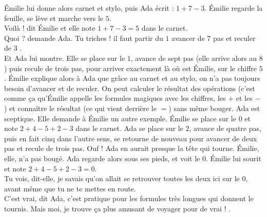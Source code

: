 Émilie lui donne alors carnet et stylo, puis Ada écrit : $1 + 7 - 3 $. Émilie regarde la feuille, se lève et marche vers le $5$.\\
\guillemotleft Voilà ! dit Émilie et elle note $1 + 7 - 3 = 5$ dans le carnet.\\
\mdash Quoi ? demande Ada. Tu triches ! il faut partir du $1$ avancer de $7$ pas et reculer de $3$ \guillemotright.\\
Et Ada lui montre. Elle se place sur le $1$, avance de sept pas (elle arrive alors au $8$) puis recule de trois pas, pour arriver exactement là où est Émilie, sur le chiffre $5$. Émilie explique alors à Ada que grâce au carnet et au stylo, on n’a pas toujours besoin d’avancer et de reculer. On peut calculer le résultat des opérations (c’est comme ça qu’Émilie appelle les formules magiques avec les chiffres, les $+$ et les $-$) et connaître le résultat (ce qui vient derrière le $=$) sans même bouger. Ada est sceptique. Elle demande à Émilie un autre exemple. Émilie se place sur le $0$ et note $2 + 4 - 5 + 2 - 3$ dans le carnet. Ada se place sur le $2$, avance de quatre pas, puis en fait cinq dans l’autre sens, se retourne de nouveau pour avancer de deux pas et recule de trois pas. Ouf ! Ada en aurait presque la tête qui tourne. Émilie, elle, n’a pas bougé. Ada regarde alors sous ses pieds, et voit le $0$. Émilie lui sourit et note $2 + 4 - 5 + 2 - 3 = 0$.\\
\guillemotleft Tu vois, dit-elle, je savais qu’on allait se retrouver toutes les deux ici sur le 0, avant même que tu ne te mettes en route.\\
\mdash C’est vrai, dit Ada, c’est pratique pour les formules très longues qui donnent le tournis. Mais moi, je trouve ça plus amusant de voyager pour de vrai ! \guillemotright.

%    
